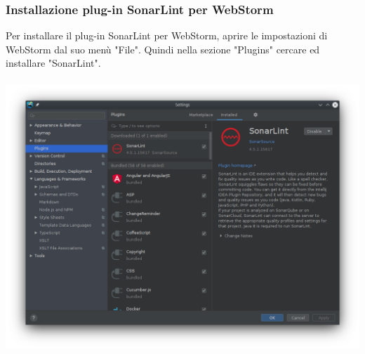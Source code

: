 \subsubsection{Installazione plug-in SonarLint per WebStorm}
Per installare il plug-in SonarLint per WebStorm, aprire le impostazioni di WebStorm dal suo menù "File". Quindi nella sezione "Plugins" cercare ed installare "SonarLint".
\\
\\
\includegraphics[width=\textwidth,height=\textheight,keepaspectratio]{img/sonarlint.png}
